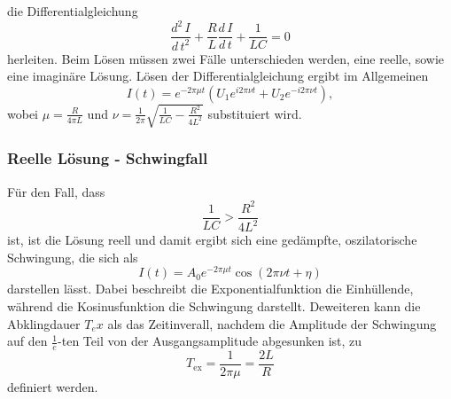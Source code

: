         \\ \\
        die Differentialgleichung 
        \begin{equation}
            \label{eqn:diffgleichung}
            \frac{d^2 \, I}{d \, t^2} + \frac{R}{L} \frac{d \, I}{d \, t} + \frac {1}{L C} = 0
        \end{equation}
        herleiten. Beim Lösen müssen zwei Fälle unterschieden werden, eine reelle, sowie eine imaginäre Lösung. 
        Lösen der Differentialgleichung ergibt im Allgemeinen
        \begin{equation}
            \label{eqn:strom_allgemein}
            I(t) = e^{-2 \pi \mu t} (U_1 e^{i 2 \pi \nu t} + U_2 e^{-i 2 \pi \nu t}),
        \end{equation}
        wobei $\mu = \frac{R}{4 \pi L} $ und $\nu = \frac{1}{2 \pi} \sqrt{\frac{1}{L C} - \frac{R^2}{4 L^2} }$
        substituiert wird.
        \subsubsection{Reelle Lösung - Schwingfall}
            Für den Fall, dass
            \begin{equation}
                \label{eqn:bedingung_reell}
                \frac{1}{L C} > \frac{R^2}{4 L^2}
            \end{equation}
            ist, ist die Lösung reell und damit ergibt sich eine gedämpfte, oszilatorische Schwingung, die sich als
            \begin{equation}
                \label{eqn:reell_lösung}
                I(t) = A_0 e^{-2 \pi \mu t} \cos(2 \pi \nu t + \eta)
            \end{equation}
            darstellen lässt. Dabei beschreibt die Exponentialfunktion die Einhüllende, während die Kosinusfunktion die Schwingung darstellt.
            Deweiteren kann die Abklingdauer $T_ex$ als das Zeitinverall, nachdem die Amplitude der Schwingung auf den $\frac{1}{e}$-ten Teil
            von der Ausgangsamplitude abgesunken ist, zu
            \begin{equation}
                \label{eqn:abklingdauer}
                T_\text{ex} = \frac{1}{2 \pi \mu} = \frac{2 L}{R}
            \end{equation}
            definiert werden.

